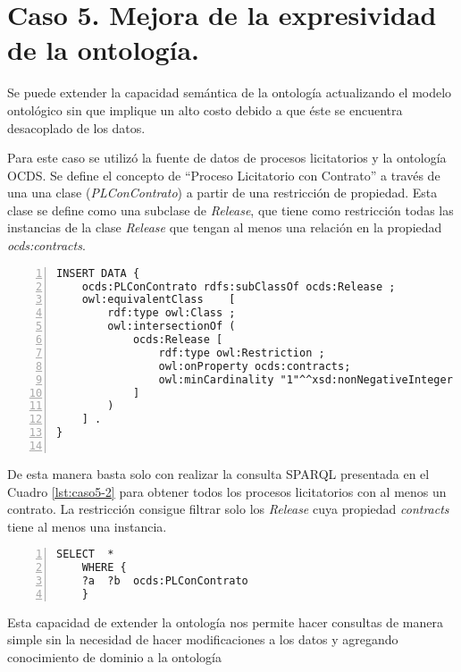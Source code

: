 \section{Caso 5. Mejora de la expresividad de la ontología. }

Se puede extender la capacidad semántica de la ontología actualizando el modelo ontológico sin que implique un alto costo debido a que éste se encuentra desacoplado de los datos.

Para este caso se utilizó la fuente de datos de procesos licitatorios y la ontología OCDS. Se define el concepto de “Proceso Licitatorio con Contrato” a través de una una clase (\textit{PLConContrato}) a partir de una restricción de propiedad. Esta clase se define como una subclase de \textit{Release}, que tiene como restricción todas las instancias de la clase \textit{Release} que tengan al menos una relación en la propiedad \textit{ocds:contracts}.\hfill \break


\noindent\begin{minipage}[c]{\textwidth}
\begin{lstlisting}[captionpos=b, caption=Extensión de la ontología utilizando restricciones ontológicas, label={lst:caso5-1},  numbers=left,  numberstyle=\tiny\color{mygray},frame=single]
INSERT DATA {
    ocds:PLConContrato rdfs:subClassOf ocds:Release ; 
    owl:equivalentClass    [ 
        rdf:type owl:Class ;
        owl:intersectionOf (   
            ocds:Release [ 
                rdf:type owl:Restriction ;
                owl:onProperty ocds:contracts; 
                owl:minCardinality "1"^^xsd:nonNegativeInteger ;
            ] 
        )
    ] .
}
    
 \end{lstlisting}
\end{minipage}
 De esta manera basta solo con realizar la consulta SPARQL presentada en el Cuadro \ref{lst:caso5-2} para obtener todos los procesos licitatorios con al menos un contrato. La restricción consigue filtrar solo los \textit{Release} cuya propiedad \textit{contracts} tiene al menos una instancia.\hfill \break

\noindent\begin{minipage}[c]{\textwidth}
 \begin{lstlisting}[captionpos=b, caption=Consulta SPARQL utilizando la Clase PLConContrato, label=lst:caso5-2,  numbers=left,  numberstyle=\tiny\color{mygray},frame=single]
SELECT  *
    WHERE { 
    ?a  ?b  ocds:PLConContrato 
    }
 \end{lstlisting}
\end{minipage}
 Esta capacidad de extender la ontología nos permite hacer consultas de manera simple sin la necesidad de hacer modificaciones a los datos y agregando conocimiento de dominio a la ontología